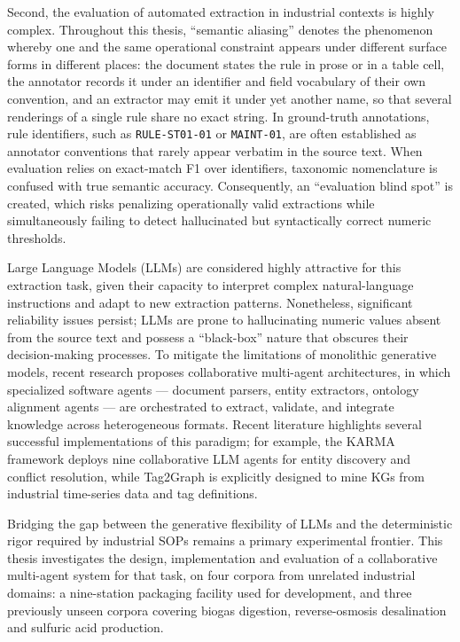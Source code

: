 \documentclass[11pt]{article}
\begin{document}
Second, the evaluation of automated extraction in industrial contexts is highly complex. Throughout this thesis, ``semantic aliasing'' denotes the phenomenon whereby one and the same operational constraint appears under different surface forms in different places: the document states the rule in prose or in a table cell, the annotator records it under an identifier and field vocabulary of their own convention, and an extractor may emit it under yet another name, so that several renderings of a single rule share no exact string. In ground-truth annotations, rule identifiers, such as \texttt{RULE-ST01-01} or \texttt{MAINT-01}, are often established as annotator conventions that rarely appear verbatim in the source text. When evaluation relies on exact-match F1 over identifiers, taxonomic nomenclature is confused with true semantic accuracy. Consequently, an ``evaluation blind spot'' is created, which risks penalizing operationally valid extractions while simultaneously failing to detect hallucinated but syntactically correct numeric thresholds.

Large Language Models (LLMs) are considered highly attractive for this extraction task, given their capacity to interpret complex natural-language instructions and adapt to new extraction patterns. Nonetheless, significant reliability issues persist; LLMs are prone to hallucinating numeric values absent from the source text and possess a ``black-box'' nature that obscures their decision-making processes. To mitigate the limitations of monolithic generative models, recent research proposes collaborative multi-agent architectures, in which specialized software agents --- document parsers, entity extractors, ontology alignment agents --- are orchestrated to extract, validate, and integrate knowledge across heterogeneous formats. Recent literature highlights several successful implementations of this paradigm; for example, the KARMA framework deploys nine collaborative LLM agents for entity discovery and conflict resolution, while Tag2Graph is explicitly designed to mine KGs from industrial time-series data and tag definitions. 

Bridging the gap between the generative flexibility of LLMs and the deterministic rigor required by industrial SOPs remains a primary experimental frontier. This thesis investigates the design, implementation and evaluation of a collaborative multi-agent system for that task, on four corpora from unrelated industrial domains: a nine-station packaging facility used for development, and three previously unseen corpora covering biogas digestion, reverse-osmosis desalination and sulfuric acid production.
\end{document}
